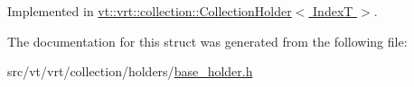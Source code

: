 Implemented in \hyperlink{structvt_1_1vrt_1_1collection_1_1_collection_holder_a00a325a6c9c321d00b6b6eb0fdfbfb9f}{vt\+::vrt\+::collection\+::\+Collection\+Holder$<$ Index\+T $>$}.



The documentation for this struct was generated from the following file\+:\begin{DoxyCompactItemize}
\item 
src/vt/vrt/collection/holders/\hyperlink{base__holder_8h}{base\+\_\+holder.\+h}\end{DoxyCompactItemize}

